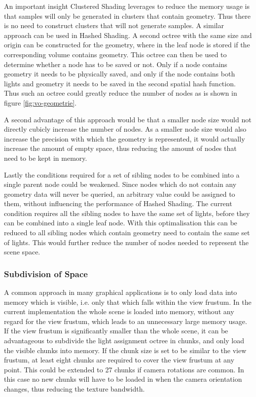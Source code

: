 

An important insight Clustered Shading leverages to reduce the memory usage is that samples
will only be generated in clusters that contain geometry. Thus there is no need to construct
clusters that will not generate samples. A similar approach can be used in Hashed Shading.
A second octree with the same size and origin can be constructed for the geometry, where in
the leaf node is stored if the corresponding volume contains geometry. This octree can then
be used to determine whether a node has to be saved or not. Only if a node contains geometry
it needs to be physically saved, and only if the node contains both lights and geometry it
needs to be saved in the second spatial hash function. Thus such an octree could greatly
reduce the number of nodes as is shown in figure \ref{fig:vo-geometrie}.

A second advantage of this approach would be that a smaller node size would not directly
cubicly increase the number of nodes. As a smaller node size would also increase the
precision with which the geometry is represented, it would actually increase the amount of
empty space, thus reducing the amount of nodes that need to be kept in memory.

Lastly the conditions required for a set of sibling nodes to be combined into a single
parent node could be weakened. Since nodes which do not contain any geometry data will
never be queried, an arbitrary value could be assigned to them, without influencing the
performance of Hashed Shading. The current condition requires all the sibling nodes to
have the same set of lights, before they can be combined into a single leaf node. With
this optimalisation this can be reduced to all sibling nodes which contain geometry
need to contain the same set of lights. This would further reduce the number of nodes
needed to represent the scene space.

\subsubsection{Subdivision of Space}



A common approach in many graphical applications is to only load data into memory which
is visible, i.e. only that which falls within the view frustum. In the current implementation
the whole scene is loaded into memory, without any regard for the view frustum, which leads
to an unnecessary large memory usage. If the view frustum is significantly smaller than the
whole scene, it can be advantageous to subdivide the light assignment octree in chunks, and
only load the visible chunks into memory. If the chunk size is set to be similar to the view
frustum, at least eight chunks are required to cover the view frustum at any point.
This could be extended to 27 chunks if camera rotations are common. In this case no new chunks
will have to be loaded in when the camera orientation changes, thus reducing the texture
bandwidth.

